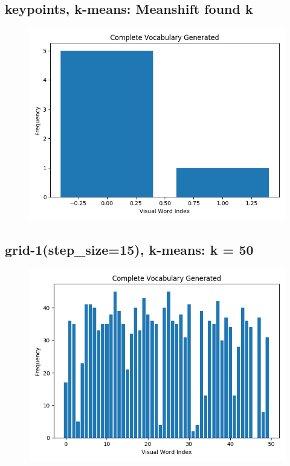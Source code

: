 
\subsection*{keypoints, k-means: Meanshift found k}
\begin{figure}[H]
    \centering
    \includegraphics[scale = 0.5]{images/bow-kp-kmeanshift.png}
\end{figure}

\subsection*{grid-1(step\_size=15), k-means: k = 50}
\begin{figure}[H]
    \centering
    \includegraphics[scale = 0.5]{images/bow-stp-15-50.png}
\end{figure}

